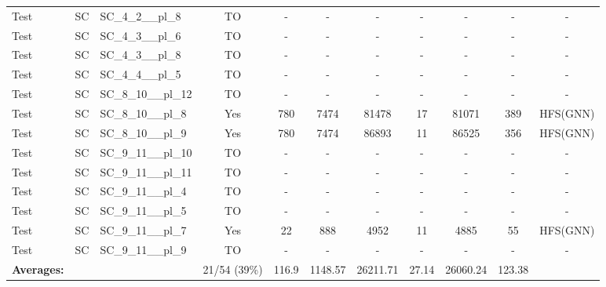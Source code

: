 \documentclass{article}
\begin{document}
\begin{tabular}{lllcccccccc}
Test & SC & SC\_4\_2\_\_pl\_8 & TO & - & - & - & - & - & - & - \\
Test & SC & SC\_4\_3\_\_pl\_6 & TO & - & - & - & - & - & - & - \\
Test & SC & SC\_4\_3\_\_pl\_8 & TO & - & - & - & - & - & - & - \\
Test & SC & SC\_4\_4\_\_pl\_5 & TO & - & - & - & - & - & - & - \\
Test & SC & SC\_8\_10\_\_pl\_12 & TO & - & - & - & - & - & - & - \\
Test & SC & SC\_8\_10\_\_pl\_8 & Yes & 780 & 7474 & 81478 & 17 & 81071 & 389 & HFS(GNN) \\
Test & SC & SC\_8\_10\_\_pl\_9 & Yes & 780 & 7474 & 86893 & 11 & 86525 & 356 & HFS(GNN) \\
Test & SC & SC\_9\_11\_\_pl\_10 & TO & - & - & - & - & - & - & - \\
Test & SC & SC\_9\_11\_\_pl\_11 & TO & - & - & - & - & - & - & - \\
Test & SC & SC\_9\_11\_\_pl\_4 & TO & - & - & - & - & - & - & - \\
Test & SC & SC\_9\_11\_\_pl\_5 & TO & - & - & - & - & - & - & - \\
Test & SC & SC\_9\_11\_\_pl\_7 & Yes & 22 & 888 & 4952 & 11 & 4885 & 55 & HFS(GNN) \\
Test & SC & SC\_9\_11\_\_pl\_9 & TO & - & - & - & - & - & - & - \\
\textbf{Averages:} & & & 21/54 (39\%) & 116.9 & 1148.57 & 26211.71 & 27.14 & 26060.24 & 123.38 & \\
\bottomrule
\end{tabular}
\newpage
\end{document}
